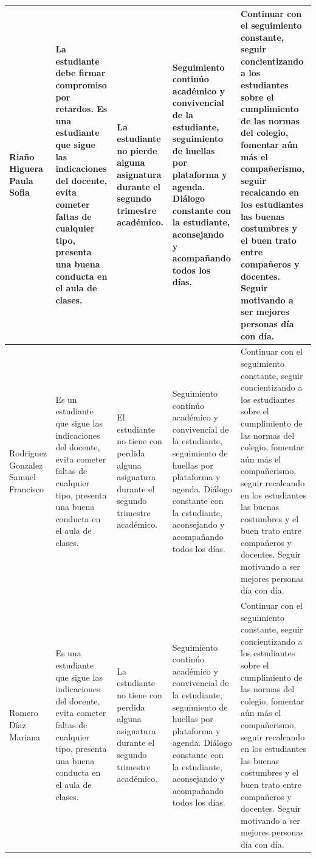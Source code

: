\documentclass[spanish,11pt,a4paper]{article}
\begin{document}
\begin{longtable}{|p{3.5cm}|p{3.5cm}|p{3.5cm}|p{3.5cm}|p{3.5cm}|}
		Riaño Higuera Paula Sofia & 
		La estudiante debe firmar compromiso por retardos.
		Es una estudiante que sigue las indicaciones del docente, evita cometer faltas de cualquier tipo, presenta una buena conducta en el aula de clases. & 
		La estudiante no pierde alguna asignatura durante el segundo trimestre académico. & 
		Seguimiento continúo académico y convivencial de la estudiante, seguimiento de huellas por plataforma y agenda. Diálogo constante con la estudiante, aconsejando y acompañando todos los días. & 
		Continuar con el seguimiento constante, seguir concientizando a los estudiantes sobre el cumplimiento de las normas del colegio, fomentar aún más el compañerismo, seguir recalcando en los estudiantes las buenas costumbres y el buen trato entre compañeros y docentes. Seguir motivando a ser mejores personas día con día.\\
		\hline
		
		Rodriguez Gonzalez Samuel Francisco & 
		Es un estudiante que sigue las indicaciones del docente, evita cometer faltas de cualquier tipo, presenta una buena conducta en el aula de clases. & 
		El estudiante no tiene con perdida alguna asignatura durante el segundo trimestre académico. & 
		Seguimiento continúo académico y convivencial de la estudiante, seguimiento de huellas por plataforma y agenda. Diálogo constante con la estudiante, aconsejando y acompañando todos los días. & 
		Continuar con el seguimiento constante, seguir concientizando a los estudiantes sobre el cumplimiento de las normas del colegio, fomentar aún más el compañerismo, seguir recalcando en los estudiantes las buenas costumbres y el buen trato entre compañeros y docentes. Seguir motivando a ser mejores personas día con día.\\
		\hline
		
		Romero Díaz Mariana & 
		Es una estudiante que sigue las indicaciones del docente, evita cometer faltas de cualquier tipo, presenta una buena conducta en el aula de clases. & 
		La estudiante no tiene con perdida alguna asignatura durante el segundo trimestre académico. & 
		Seguimiento continúo académico y convivencial de la estudiante, seguimiento de huellas por plataforma y agenda. Diálogo constante con la estudiante, aconsejando y acompañando todos los días. & 
		Continuar con el seguimiento constante, seguir concientizando a los estudiantes sobre el cumplimiento de las normas del colegio, fomentar aún más el compañerismo, seguir recalcando en los estudiantes las buenas costumbres y el buen trato entre compañeros y docentes. Seguir motivando a ser mejores personas día con día.\\
		\hline
		
	\end{longtable}
	
\end{document}

